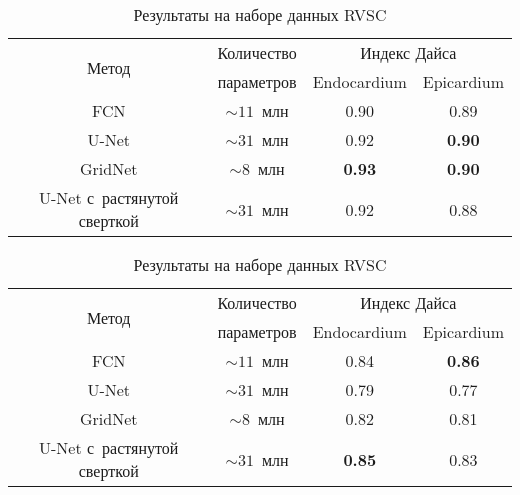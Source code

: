 \begin{table}[h]
  \begin{center}
    \caption{Результаты на наборе данных LVSC} \label{tab:lvsc_results}
    \begin{tabular}{ |c||*{3}{c|} }
      \hline
      \multirow{2}{*}{Метод}      & Количество   & \multicolumn{2}{c|}{Индекс Дайса} \\ \cline{3-4}
                                  & параметров   & Endocardium   & Epicardium        \\ \hline
      \hline
      FCN                         & $\sim11$~млн & 0.90          & 0.89              \\ \hline
      U-Net                       & $\sim31$~млн & 0.92          & \textbf{0.90}     \\ \hline
      GridNet                     &  $\sim8$~млн & \textbf{0.93} & \textbf{0.90}     \\ \hline
      U-Net с~растянутой сверткой & $\sim31$~млн & 0.92          & 0.88              \\ 
      \hline
    \end{tabular}

    \vspace{0.6cm}
    
    \caption{Результаты на наборе данных RVSC} \label{tab:rvsc_results}
    \begin{tabular}{ |c||*{3}{c|} }
      \hline
      \multirow{2}{*}{Метод}      & Количество   & \multicolumn{2}{c|}{Индекс Дайса} \\ \cline{3-4}
                                  & параметров   & Endocardium   & Epicardium        \\ \hline
      \hline
      FCN                         & $\sim11$~млн & 0.84          & \textbf{0.86}     \\ \hline
      U-Net                       & $\sim31$~млн & 0.79          & 0.77              \\ \hline
      GridNet                     &  $\sim8$~млн & 0.82          & 0.81              \\ \hline
      U-Net с~растянутой сверткой & $\sim31$~млн & \textbf{0.85} & 0.83              \\ 
      \hline
    \end{tabular}

    \vspace{0.6cm}
    

\end{center}
\end{table}
